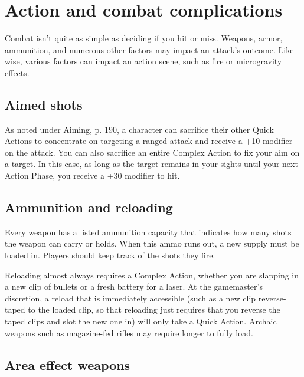 \section{Action and combat complications} \label{sec:action-combat-comp} 

Combat isn’t quite as simple as deciding if you hit or miss. Weapons, armor, ammunition, and numerous other factors may impact an attack’s outcome. Like- wise, various factors can impact an action scene, such as fire or microgravity effects. 



\subsection{Aimed shots} \label{sec:aimed-shots} 

As noted under Aiming, p. 190, a character can sacrifice their other Quick Actions to concentrate on targeting a ranged attack and receive a +10 modifier on the attack. You can also sacrifice an entire Complex Action to fix your aim on a target. In this case, as long as the target remains in your sights until your next Action Phase, you receive a +30 modifier to hit. 



\subsection{Ammunition and reloading} \label{sec:ammunition-reloading} 

Every weapon has a listed ammunition capacity that indicates how many shots the weapon can carry or holds. When this ammo runs out, a new supply must be loaded in. Players should keep track of the shots they fire. 

Reloading almost always requires a Complex Action, whether you are slapping in a new clip of bullets or a fresh battery for a laser. At the gamemaster’s discretion, a reload that is immediately accessible (such as a new clip reverse-taped to the loaded clip, so that reloading just requires that you reverse the taped clips and slot the new one in) will only take a Quick Action. Archaic weapons such as magazine-fed rifles may require longer to fully load. 



\subsection{Area effect weapons} \label{sec:area-effect-weapons} 

